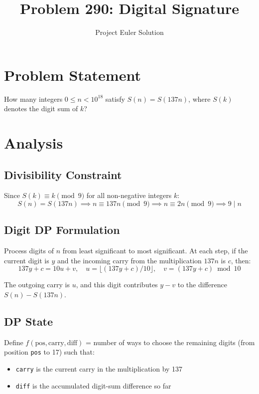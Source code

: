 \documentclass[12pt]{article}
\title{Problem 290: Digital Signature}
\author{Project Euler Solution}
\date{}
\begin{document}
\maketitle

\section{Problem Statement}

How many integers $0 \le n < 10^{18}$ satisfy $S(n) = S(137n)$, where $S(k)$ denotes the digit sum of $k$?

\section{Analysis}

\subsection{Divisibility Constraint}

Since $S(k) \equiv k \pmod{9}$ for all non-negative integers $k$:
\[
S(n) = S(137n) \implies n \equiv 137n \pmod{9} \implies n \equiv 2n \pmod{9} \implies 9 \mid n
\]

\subsection{Digit DP Formulation}

Process digits of $n$ from least significant to most significant. At each step, if the current digit is $y$ and the incoming carry from the multiplication $137n$ is $c$, then:
\[
137y + c = 10u + v, \quad u = \lfloor(137y + c)/10\rfloor, \quad v = (137y + c) \bmod 10
\]

The outgoing carry is $u$, and this digit contributes $y - v$ to the difference $S(n) - S(137n)$.

\subsection{DP State}

Define $f(\text{pos}, \text{carry}, \text{diff})$ = number of ways to choose the remaining digits (from position \texttt{pos} to 17) such that:
\begin{itemize}
    \item \texttt{carry} is the current carry in the multiplication by 137
    \item \texttt{diff} is the accumulated digit-sum difference so far
\end{itemize}
\end{document}
